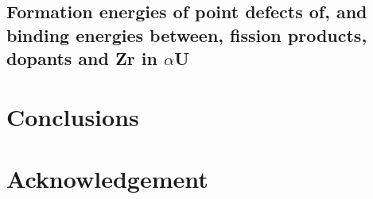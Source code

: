 \documentclass[review]{elsarticle}
\begin{document}
\subsection{Formation energies of point defects of, and binding energies between, fission products, dopants and Zr in $\alpha$U}



\FloatBarrier
\section{Conclusions}


\section{Acknowledgement}


\FloatBarrier


\end{document}
